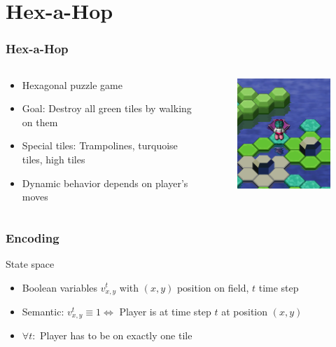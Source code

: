 \section{Hex-a-Hop}

\begin{frame}
	\frametitle{Hex-a-Hop}
	\begin{columns}
		\begin{column}{6cm}
			\begin{itemize}
				\item Hexagonal puzzle game
				\item<2-> Goal: Destroy all green tiles by walking on them
				\item<3-> Special tiles: Trampolines, turquoise tiles, high tiles
				\item<4-> Dynamic behavior depends on player's moves
			\end{itemize}
		\end{column}
		\begin{column}{5cm}
			\begin{figure}
				\centering
				\includegraphics[width=5cm]{images/hexahop.png}
			\end{figure}
		\end{column}
	\end{columns}
\end{frame}

\begin{frame}
	\frametitle{Encoding}
	\begin{block}{State space}
		\begin{itemize}	
			\item Boolean variables $v_{x,y}^{t}$ with $(x,y)$ position on field, $t$ time step
			\item Semantic: $v_{x,y}^{t} \equiv 1 \Leftrightarrow$ Player is at time step $t$ at position $(x,y)$
		\end{itemize}
	\end{block}
	\begin{itemize}
		\item $\forall t:$ Player has to be on exactly one tile
	\end{itemize}
\end{frame}

